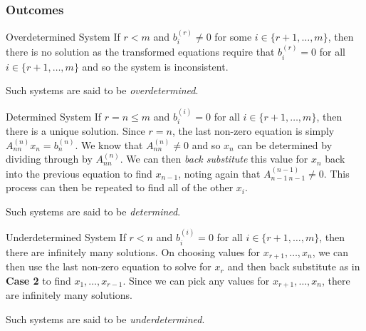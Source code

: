 \documentclass[../main.tex]{subfiles}
\begin{document}
\subsubsection{Outcomes}
\begin{proofcases}
  \begin{case}{Overdetermined System}
    If $r < m$ and $b^{(r)}_i \neq 0$ for some $i \in \{r + 1, \ldots, m\}$, then there is no solution as the transformed equations require that $b^{(r)}_i = 0$ for all $i \in \{r + 1, \ldots, m\}$ and so the system is inconsistent.

    Such systems are said to be \textit{overdetermined}.
  \end{case}
  \begin{case}{Determined System}
    If $r = n \leq m$ and $b^{(i)}_i = 0$ for all $i \in \{r + 1, \ldots, m\}$, then there is a unique solution.
    Since $r = n$, the last non-zero equation is simply $A^{(n)}_{n n}x_n = b^{(n)}_n$.
    We know that $A^{(n)}_{n n} \neq 0$ and so $x_n$ can be determined by dividing through by $A^{(n)}_{n n}$.
    We can then \textit{back substitute} this value for $x_n$ back into the previous equation to find $x_{n - 1}$, noting again that $A^{(n - 1)}_{n - 1\ n - 1} \neq 0$.
    This process can then be repeated to find all of the other $x_i$.

    Such systems are said to be \textit{determined}.
  \end{case}
  \begin{case}{Underdetermined System}
    If $r < n$ and $b^{(i)}_i = 0$ for all $i \in \{r + 1, \ldots, m\}$, then there are infinitely many solutions. On choosing values for $x_{r + 1}, \ldots, x_n$, we can then use the last non-zero equation to solve for $x_r$ and then back substitute as in \textbf{Case 2} to find $x_1, \ldots, x_{r - 1}$.
    Since we can pick any values for $x_{r + 1}, \ldots, x_n$, there are infinitely many solutions.

    Such systems are said to be \textit{underdetermined}.
  \end{case}
\end{proofcases}
\end{document}
